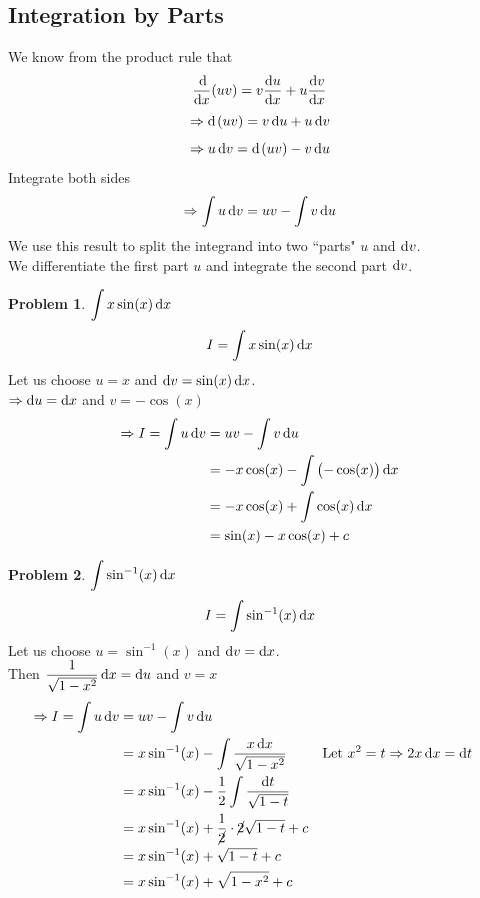 \documentclass[14]{article}
\theoremstyle{definition}
\newtheorem{prob}{Problem}
\theoremstyle{case}
\begin{document}
\subsection{Integration by Parts}
We know from the product rule that
\[\dfrac{\dif}{\dif x}(uv) = v\dfrac{\dif u}{\dif x} + u \dfrac{\dif v}{\dif x}\]
\[\Rightarrow \dif\; (uv) = v \dif u + u \dif v\]
\[\Rightarrow u \dif v = \dif\; (uv) - v \dif u\]
Integrate both sides\\
\[\Rightarrow \int u \dif v = uv - \int v \dif u\]
We use this result to split the integrand into two ``parts" $u$ and $\dif v$.\\ We differentiate the first part $u$ and integrate the second part $\dif v$. 
\begin{prob}
$\displaystyle\int x \sin(x) \dif x$
\[I = \int x \sin(x) \dif x\]
Let us choose $u = x$ and $\dif v = \sin(x) \dif x$.\\
$\Rightarrow \dif u = \dif x$ and $v =-\cos(x)$
\begin{align*}
\Rightarrow I = \int u \dif v &= uv - \int v \dif u\\
&= -x \cos(x) - \int \left(- \cos(x)\right) \dif x\\
&= -x \cos(x) + \int \cos(x) \dif x\\
&= \sin(x) - x \cos(x) + c
\end{align*}
\end{prob}
\begin{prob}
$\displaystyle \int \sin^{-1}(x) \dif x$
\begin{align*}
I &= \int\sin^{-1}(x) \dif x\\
\end{align*}
Let us choose $u=\sin^{-1}(x)$ and $\dif v=\dif x$.\\
Then $\dfrac1{\sqrt{1 - x^2}} \dif x = \dif u$ and $v = x$
\begin{align*}
\Rightarrow I = \int u \dif v &= uv - \int v \dif u\\
&= x \sin^{-1}(x) - \int \dfrac{x \dif x}{\sqrt{1 - x^2}} && \text{Let } x^2 = t \Rightarrow 2x \dif x = \dif t\\
&= x \sin^{-1}(x) - \dfrac12 \int \dfrac{\dif t}{\sqrt{1 - t}}\\
&= x \sin^{-1}(x) + \dfrac1{\cancel{2}} \cdot \cancel{2}\sqrt{1-t}+c\\
&= x \sin^{-1}(x) + \sqrt{1-t}+c\\
&= x \sin^{-1}(x) + \sqrt{1-x^2}+c
\end{align*}
\end{prob}
\pagebreak
\end{document}
